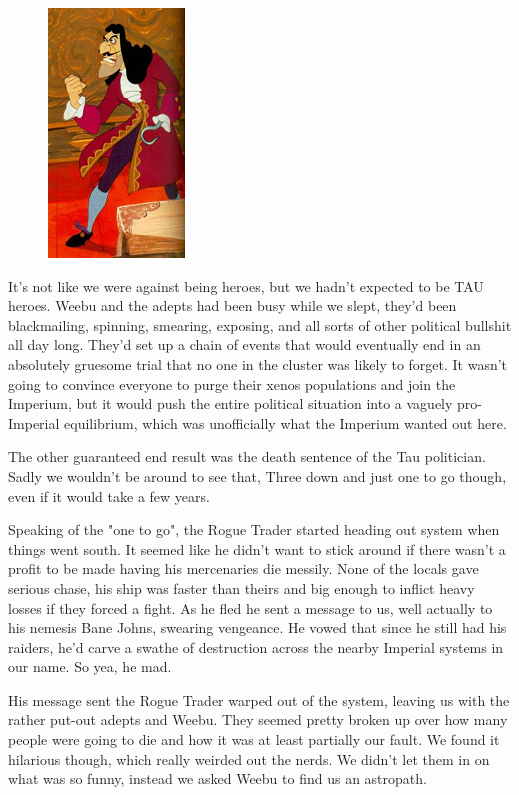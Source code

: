 \begin{figure}
	\begin{center}
		\includegraphics[width=\figwidth]{pics/10/74.png}
	\end{center}
\end{figure}
It's not like we were against being heroes, but we hadn't expected to be TAU heroes. 
Weebu and the adepts had been busy while we slept, they'd been blackmailing, spinning, smearing, exposing, and all sorts of other political bullshit all day long. 
They'd set up a chain of events that would eventually end in an absolutely gruesome trial that no one in the cluster was likely to forget. 
It wasn't going to convince everyone to purge their xenos populations and join the Imperium, but it would push the entire political situation into a vaguely pro-Imperial equilibrium, which was unofficially what the Imperium wanted out here. 


The other guaranteed end result was the death sentence of the Tau politician. 
Sadly we wouldn't be around to see that, Three down and just one to go though, even if it would take a few years.

Speaking of the "one to go", the Rogue Trader started heading out system when things went south. 
It seemed like he didn't want to stick around if there wasn't a profit to be made having his mercenaries die messily. 
None of the locals gave serious chase, his ship was faster than theirs and big enough to inflict heavy losses if they forced a fight. 
As he fled he sent a message to us, well actually to his nemesis Bane Johns, swearing vengeance. 
He vowed that since he still had his raiders, he'd carve a swathe of destruction across the nearby Imperial systems in our name. 
So yea, he mad.

His message sent the Rogue Trader warped out of the system, leaving us with the rather put-out adepts and Weebu. 
They seemed pretty broken up over how many people were going to die and how it was at least partially our fault. 
We found it hilarious though, which really weirded out the nerds. 
We didn't let them in on what was so funny, instead we asked Weebu to find us an astropath.

